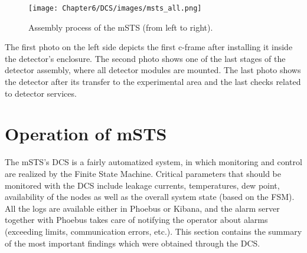 \begin{figure}[h!]
\centering
\texttt{[image: Chapter6/DCS/images/msts\_all.png]}
\caption{Assembly process of the \gls{mSTS} (from left to right).}
\label{fig_msts_state}
\end{figure}
 The first photo on the left side depicts the first c-frame after installing it inside the detector's enclosure. The second photo shows one of the last stages of the detector assembly, where all detector modules are mounted. The last photo shows the detector after its transfer to the experimental area and the last checks related to detector services. %

\section{Operation of mSTS}

The \gls{mSTS}'s \gls{DCS} is a fairly automatized system, in which monitoring and control are realized by the Finite State Machine. Critical parameters that should be monitored with the \gls{DCS} include leakage currents, temperatures, dew point, availability of the nodes as well as the overall system state (based on the \gls{FSM}). All the logs are available either in Phoebus or Kibana, and the alarm server together with Phoebus takes care of notifying the operator about alarms (exceeding limits, communication errors, etc.). This section contains the summary of the most important findings which were obtained through the \gls{DCS}. 


